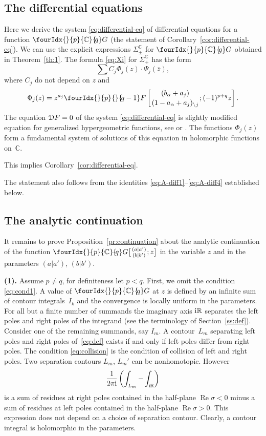 \documentclass[pdftex]{sigma}
\numberwithin{equation}{section}
\renewcommand{\Re}{\mathop {\mathrm {Re}}\nolimits}
\newcommand{\hyp}[2]{\fourIdx{}{#1}{}{\!#2}F}
\newcommand{\Gc}[2]{\fourIdx{}{#1}{\C}{\!#2}G}
\def\ov{\overline}
\renewcommand{\Re}{\mathop {\mathrm {Re}}\nolimits}
\def\R {{\mathbb R }}
\def\C {{\mathbb C }}
\def\cD{\EuScript D}
\begin{document}
\subsection{The differential equations}
Here we derive the system \eqref{eq:differential-eq}
of differential equations for a function $\Gc{p}{q}$
(the statement of Corollary~\ref{cor:differential-eq}).
We can use the explicit expressions $\Sigma_\pm^\C$ for
$\Gc{p}{q}$ obtained in Theorem~\ref{th:1}.
The formula \eqref{eq:Xi} for $\Sigma_+^\C$ has the form
\[
\sum C_j \Phi_j(z)\cdot \Psi_j(\ov z),
\]
where $C_j$ do not depend on $z$ and
\[
\Phi_j(z)= z^{a_j} \hyp{p}{q-1}
\left[\genfrac{}{}{0pt}{}{(b_\alpha+a_j)}{(1-a_\alpha+a_j)_{\setminus j}};
(-1)^{p+q} z\right].
\]
The equation $\cD F=0$ of the system \eqref{eq:differential-eq}
is slightly modified equation for generalized hypergeometric functions,
see \cite[Section~2.1.2]{Sla} or \cite[Section~5.2]{Luke}.
The functions $\Phi_j(z)$ form a fundamental system of solutions
of this equation in holomorphic functions on~$\C$.

This implies Corollary~\ref{cor:differential-eq}.

\begin{Remark}
The statement also follows from the
identities \eqref{eq:A-diff1}--\eqref{eq:A-diff4} established below.
\end{Remark}

\subsection{The analytic continuation}
It remains to prove Proposition~\ref{pr:continuation} about the analytic
continuation of the function
$\Gc{p}{q}\big[\genfrac{}{}{0pt}{}{(a|a')}{(b|b')};z\big]$
in the variable $z$ and in the parameters $(a|a')$, $(b|b')$.

\textbf{(1).}
Assume $p\ne q$, for definiteness let $p<q$.
First, we omit the condition \eqref{eq:cond1}.
A value of $\Gc{p}{q}$ at $z$ is defined by an infinite sum of contour
integrals~$I_k$ and the convergence is locally
uniform in the parameters.
For all but a finite number of summands the imaginary axis ${\rm i}\R$
separates the left poles and right poles of the integrand
(see the terminology of Section~\ref{ss:def}).
Consider one of the remaining summands, say $I_m$.
A contour~$L_m$ separating left poles and right poles
of~\eqref{eq:def} exists if and only if left poles differ from right poles.
The condition \eqref{eq:collision} is the condition of collision of
left and right poles.
Two separation contours $L_m$, $L_m'$ can be nonhomotopic.
However
\[
\frac{1}{2\pi {\rm i}}\left(\int_{L_m}-\int_{{\rm i}\R}\right)
\]
is a sum of residues at right poles contained in the half-plane
$\Re\sigma<0$ minus a sum of residues at left poles contained in
the half-plane $\Re\sigma>0$.
This expression does not depend on a choice of separation contour.
Clearly, a contour integral is holomorphic in the parameters.
\end{document}
